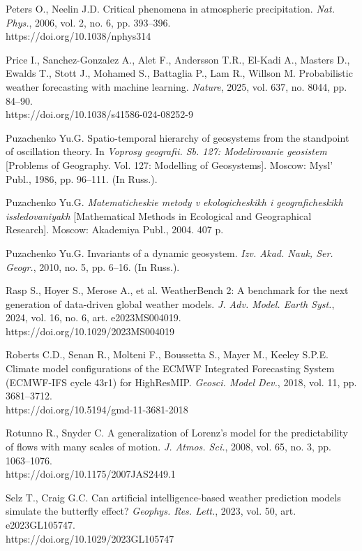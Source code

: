 \documentclass[12pt,a4paper]{article}
\begin{document}
\noindent Peters O., Neelin J.D. Critical phenomena in atmospheric precipitation. \textit{Nat. Phys.}, 2006, vol. 2, no. 6, pp. 393–396.\\ https://doi.org/10.1038/nphys314

\noindent Price I., Sanchez-Gonzalez A., Alet F., Andersson T.R., El-Kadi A., Masters D., Ewalds T., Stott J., Mohamed S., Battaglia P., Lam R., Willson M. Probabilistic weather forecasting with machine learning. \textit{Nature}, 2025, vol. 637, no. 8044, pp. 84–90.\\ https://doi.org/10.1038/s41586-024-08252-9

\noindent Puzachenko Yu.G. Spatio-temporal hierarchy of geosystems from the standpoint of oscillation theory. In \textit{Voprosy geografii. Sb. 127: Modelirovanie geosistem} [Problems of Geography. Vol. 127: Modelling of Geosystems]. Moscow: Mysl’ Publ., 1986, pp. 96–111. (In Russ.).

\noindent Puzachenko Yu.G. \textit{Matematicheskie metody v ekologicheskikh i geograficheskikh issledovaniyakh} [Mathematical Methods in Ecological and Geographical Research]. Moscow: Akademiya Publ., 2004. 407 p.

\noindent Puzachenko Yu.G. Invariants of a dynamic geosystem. \textit{Izv. Akad. Nauk, Ser. Geogr.}, 2010, no. 5, pp. 6–16. (In Russ.).

\noindent Rasp S., Hoyer S., Merose A., et al. WeatherBench 2: A benchmark for the next generation of data-driven global weather models. \textit{J. Adv. Model. Earth Syst.}, 2024, vol. 16, no. 6, art. e2023MS004019.\\ https://doi.org/10.1029/2023MS004019

\noindent Roberts C.D., Senan R., Molteni F., Boussetta S., Mayer M., Keeley S.P.E. Climate model configurations of the ECMWF Integrated Forecasting System (ECMWF-IFS cycle 43r1) for HighResMIP. \textit{Geosci. Model Dev.}, 2018, vol. 11, pp. 3681–3712.\\ https://doi.org/10.5194/gmd-11-3681-2018

\noindent Rotunno R., Snyder C. A generalization of Lorenz's model for the predictability of flows with many scales of motion. \textit{J. Atmos. Sci.}, 2008, vol. 65, no. 3, pp. 1063–1076.\\ https://doi.org/10.1175/2007JAS2449.1

\noindent Selz T., Craig G.C. Can artificial intelligence-based weather prediction models simulate the butterfly effect? \textit{Geophys. Res. Lett.}, 2023, vol. 50, art. e2023GL105747.\\ https://doi.org/10.1029/2023GL105747
\end{document}
